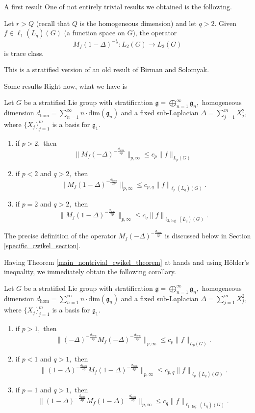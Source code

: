 \documentclass{beamer}
\numberwithin{equation}{section}
\theoremstyle{plain}
\theoremstyle{plain}
\theoremstyle{definition}
\theoremstyle{plain}
\theoremstyle{plain}
\theoremstyle{definition}
\newcommand{\gf}{\mathfrak{g}}
\begin{document}
\begin{frame}{A first result}
One of not entirely trivial results we obtained is the following.
\begin{theorem}
  Let $r>Q$ (recall that $Q$ is the homogeneous dimension) and let $q>2.$ Given $f \in \ell_1(L_q)(G)$ (a function space on $G$), the operator
  \[
M_f(1-\Delta)^{-\frac{r}{2}}:L_2(G)\to L_2(G)
  \]
  is trace class.
\end{theorem}
This is a stratified version of an old result of Birman and Solomyak.
\end{frame}

\begin{frame}{Some results}
Right now, what we have is
\begin{theorem}\label{main_nontrivial_cwikel_theorem}
Let $G$ be a stratified Lie group with stratification $\gf = \bigoplus_{n=1}^\infty \gf_n,$ homogeneous dimension $d_{\hom} = \sum_{n=1}^\infty n\cdot \mathrm{dim}(\gf_n)$
and a fixed sub-Laplacian $\Delta = \sum_{j=1}^m X_j^2,$ where $\{X_j\}_{j=1}^m$ is a basis for $\gf_1.$
\begin{enumerate}[{\rm (i)}]
\item\label{mncta} if $p>2,$ then
$$\|M_f(-\Delta)^{-\frac{d_{\hom}}{2p}}\|_{p,\infty}\leq c_p\|f\|_{L_p(G)}$$
\item\label{mnctb} if $p<2$ and $q>2,$ then
$$\|M_f(1-\Delta)^{-\frac{d_{\hom}}{2p}}\|_{p,\infty}\leq c_{p,q}\|f\|_{\ell_p(L_q)(G)}.$$
\item\label{mnctc} if $p=2$ and $q>2,$ then
$$\|M_f(1-\Delta)^{-\frac{d_{\hom}}{2p}}\|_{p,\infty}\leq c_q\|f\|_{\ell_{2,\log}(L_q)(G)}.$$
\end{enumerate}
\end{theorem}
The precise definition of the operator $M_f(-\Delta)^{-\frac{d_{\hom}}{2p}}$ is discussed below in Section \ref{specific_cwikel_section}.

Having Theorem \ref{main_nontrivial_cwikel_theorem} at hands and using H\"older's inequality, we immediately obtain the following corollary.

\begin{corollary}\label{main_nontrivial_cwikel_corollary} Let $G$ be a stratified Lie group with stratification $\gf = \bigoplus_{n=1}^\infty \gf_n,$ homogeneous dimension $d_{\hom} = \sum_{n=1}^\infty n\cdot \mathrm{dim}(\gf_n)$
and a fixed sub-Laplacian $\Delta = \sum_{j=1}^m X_j^2,$ where $\{X_j\}_{j=1}^m$ is a basis for $\gf_1.$
\begin{enumerate}[{\rm (i)}]
\item if $p>1,$ then
$$\|(-\Delta)^{-\frac{d_{\hom}}{4p}}M_f(-\Delta)^{-\frac{d_{\hom}}{4p}}\|_{p,\infty}\leq c_p\|f\|_{L_p(G)}.$$
\item if $p<1$ and $q>1,$ then
$$\|(1-\Delta)^{-\frac{d_{\hom}}{4p}}M_f(1-\Delta)^{-\frac{d_{\hom}}{4p}}\|_{p,\infty}\leq c_{p,q}\|f\|_{\ell_p(L_q)(G)}.$$
\item if $p=1$ and $q>1,$ then
$$\|(1-\Delta)^{-\frac{d_{\hom}}{4p}}M_f(1-\Delta)^{-\frac{d_{\hom}}{4p}}\|_{p,\infty}\leq c_q\|f\|_{\ell_{1,\log}(L_q)(G)}.$$
\end{enumerate}
\end{corollary}


\end{frame}
\end{document}
